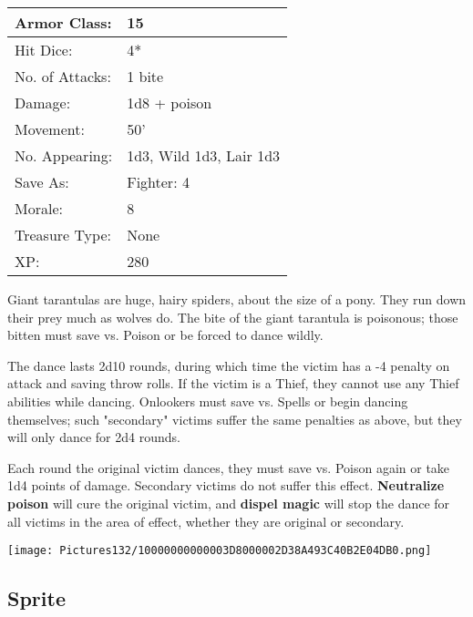 \documentclass[a4paper,twoside,openany,10pt]{book}
\begin{document}
\begin{multicols}{2}
\begin{tabularx}{0.50\textwidth}{@{}lX@{}}
Armor Class: & 15 \\\hline
Hit Dice: & 4* \\\hline
No. of Attacks: & 1 bite \\\hline
Damage: & 1d8 + poison \\\hline
Movement: & 50' \\\hline
No. Appearing: & 1d3, Wild 1d3, Lair 1d3 \\\hline
Save As: & Fighter: 4 \\\hline
Morale: & 8 \\\hline
Treasure Type: & None \\\hline
XP: & 280 \\\hline
\end{tabularx}\medskip

Giant tarantulas are huge, hairy spiders, about the size of a pony. They run down their prey much as wolves do. The bite of the giant tarantula is poisonous; those bitten must save vs. Poison or be forced to dance wildly. 

The dance lasts 2d10 rounds, during which time the victim has a -4 penalty on attack and saving throw rolls. If the victim is a Thief, they cannot use any Thief abilities while dancing. Onlookers must save vs. Spells or begin dancing themselves; such "secondary" victims suffer the same penalties as above, but they will only dance for 2d4 rounds.

Each round the original victim dances, they must save vs. Poison again or take 1d4 points of damage. Secondary victims do not suffer this effect. \textbf{Neutralize poison} will cure the original victim, and \textbf{dispel magic} will stop the dance for all victims in the area of effect, whether they are original or secondary.

\vfill

\begin{center} \texttt{[image: Pictures132/10000000000003D8000002D38A493C40B2E04DB0.png]} \end{center}

\columnbreak

\subsection*{Sprite}\label{sprite}


\end{multicols}
\end{document}
